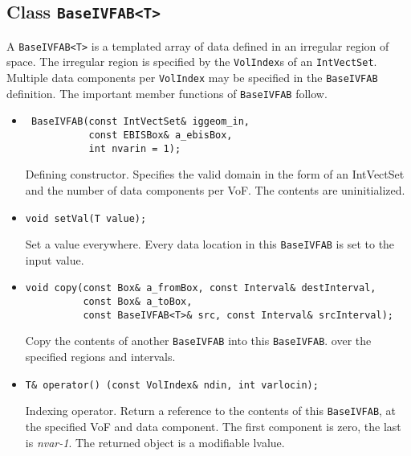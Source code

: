 \subsection{Class {\tt BaseIVFAB<T>}}
\label{sec::BaseIVFAB}

A {\tt BaseIVFAB<T>} is a templated
array of data defined in an irregular region of space.
The irregular region is specified by the {\tt VolIndex}s of an {\tt IntVectSet}.
Multiple data components per {\tt VolIndex} may be specified in the
{\tt BaseIVFAB} definition.  The important member functions of {\tt BaseIVFAB}
follow.
\begin{itemize}
\item \begin{verbatim} 
 BaseIVFAB(const IntVectSet& iggeom_in,               
           const EBISBox& a_ebisBox,
           int nvarin = 1);
\end{verbatim} 
Defining constructor.  Specifies the valid domain in the form of
an IntVectSet and the number of data components per VoF.  The
contents are uninitialized. 

\item \begin{verbatim}
void setVal(T value);
\end{verbatim}
Set a value everywhere.  Every data location in this {\tt BaseIVFAB} is
set to the input value.

\item \begin{verbatim}
void copy(const Box& a_fromBox, const Interval& destInterval,
          const Box& a_toBox,     
          const BaseIVFAB<T>& src, const Interval& srcInterval);
\end{verbatim}
Copy the contents of another {\tt BaseIVFAB} into this {\tt BaseIVFAB}.  
over the specified regions and intervals.

\item \begin{verbatim}
T& operator() (const VolIndex& ndin, int varlocin);
\end{verbatim}
Indexing operator.  Return a reference to the contents of this {\tt BaseIVFAB},
at the specified VoF and data component.  The first component is
zero, the last is {\em nvar-1}.  The returned object is a modifiable
lvalue.     

\end{itemize}




